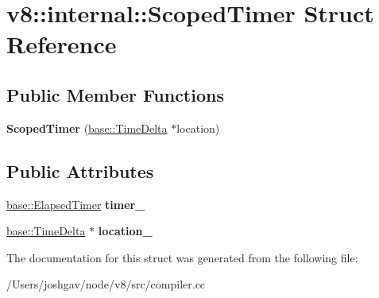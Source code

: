 \hypertarget{structv8_1_1internal_1_1_scoped_timer}{}\section{v8\+:\+:internal\+:\+:Scoped\+Timer Struct Reference}
\label{structv8_1_1internal_1_1_scoped_timer}
\subsection*{Public Member Functions}
\begin{DoxyCompactItemize}
\item 
{\bfseries Scoped\+Timer} (\hyperlink{classv8_1_1base_1_1_time_delta}{base\+::\+Time\+Delta} $\ast$location)\hypertarget{structv8_1_1internal_1_1_scoped_timer_a78b2063ef5c2c50651a43769a522eaf1}{}\label{structv8_1_1internal_1_1_scoped_timer_a78b2063ef5c2c50651a43769a522eaf1}

\end{DoxyCompactItemize}
\subsection*{Public Attributes}
\begin{DoxyCompactItemize}
\item 
\hyperlink{classv8_1_1base_1_1_elapsed_timer}{base\+::\+Elapsed\+Timer} {\bfseries timer\+\_\+}\hypertarget{structv8_1_1internal_1_1_scoped_timer_a0f38427e604d44f3c5c3b6ccd6cca4fa}{}\label{structv8_1_1internal_1_1_scoped_timer_a0f38427e604d44f3c5c3b6ccd6cca4fa}

\item 
\hyperlink{classv8_1_1base_1_1_time_delta}{base\+::\+Time\+Delta} $\ast$ {\bfseries location\+\_\+}\hypertarget{structv8_1_1internal_1_1_scoped_timer_ab6e7876ccdc4f67b79e9830e24f618ac}{}\label{structv8_1_1internal_1_1_scoped_timer_ab6e7876ccdc4f67b79e9830e24f618ac}

\end{DoxyCompactItemize}


The documentation for this struct was generated from the following file\+:\begin{DoxyCompactItemize}
\item 
/\+Users/joshgav/node/v8/src/compiler.\+cc\end{DoxyCompactItemize}
